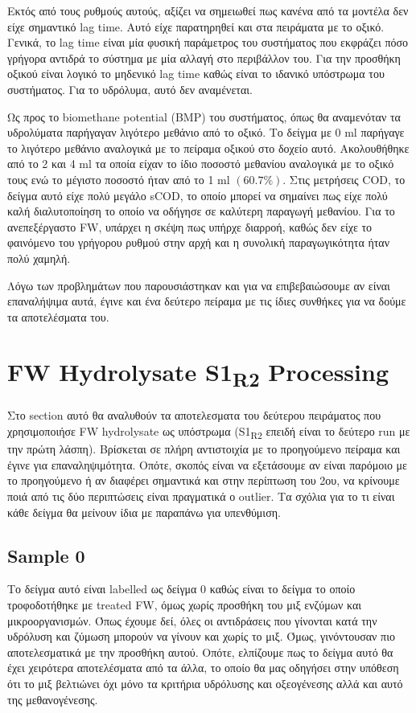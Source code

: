 \documentclass[11pt]{article}
\begin{document}
Εκτός από τους ρυθμούς αυτούς, αξίζει να σημειωθεί πως κανένα από τα μοντέλα δεν είχε σημαντικό lag time. Αυτό είχε παρατηρηθεί και στα πειράματα με το οξικό. Γενικά, το lag time είναι μία φυσική παράμετρος του συστήματος που εκφράζει πόσο γρήγορα αντιδρά το σύστημα με μία αλλαγή στο περιβάλλον του. Για την προσθήκη οξικού είναι λογικό το μηδενικό lag time καθώς είναι το ιδανικό υπόστρωμα του συστήματος. Για το υδρόλυμα, αυτό δεν αναμένεται.

Ως προς το biomethane potential (BMP) του συστήματος, όπως θα αναμενόταν τα υδρολύματα παρήγαγαν λιγότερο μεθάνιο από το οξικό. Το δείγμα με 0 ml παρήγαγε το λιγότερο μεθάνιο αναλογικά με το πείραμα οξικού στο δοχείο αυτό. Ακολουθήθηκε από το 2 και 4 ml τα οποία είχαν το ίδιο ποσοστό μεθανίου αναλογικά με το οξικό τους ενώ το μέγιστο ποσοστό ήταν από το 1 ml \(( 60.7 \% )\). Στις μετρήσεις COD, το δείγμα αυτό είχε πολύ μεγάλο sCOD, το οποίο μπορεί να σημαίνει πως είχε πολύ καλή διαλυτοποίηση το οποίο να οδήγησε σε καλύτερη παραγωγή μεθανίου. Για το ανεπεξέργαστο FW, υπάρχει η σκέψη πως υπήρχε διαρροή, καθώς δεν είχε το φαινόμενο του γρήγορου ρυθμού στην αρχή και η συνολική παραγωγικότητα ήταν πολύ χαμηλή.

Λόγω των προβλημάτων που παρουσιάστηκαν και για να επιβεβαιώσουμε αν είναι επαναλήψιμα αυτά, έγινε και ένα δεύτερο πείραμα με τις ίδιες συνθήκες για να δούμε τα αποτελέσματα του.

\section{FW Hydrolysate S1\textsubscript{R2} Processing}
\label{sec:org8c73206}
Στο section αυτό θα αναλυθούν τα αποτελεσματα του δεύτερου πειράματος που χρησιμοποιήσε FW hydrolysate ως υπόστρωμα (S1\textsubscript{R2} επειδή είναι το δεύτερο run με την πρώτη λάσπη). Βρίσκεται σε πλήρη αντιστοιχία με το προηγούμενο πείραμα και έγινε για επαναληψιμότητα. Οπότε, σκοπός είναι να εξετάσουμε αν είναι παρόμοιο με το προηγούμενο ή αν διαφέρει σημαντικά και στην περίπτωση του 2ου, να κρίνουμε ποιά από τις δύο περιπτώσεις είναι πραγματικά ο outlier. Τα σχόλια για το τι είναι κάθε δείγμα θα μείνουν ίδια με παραπάνω για υπενθύμιση.

\subsection{Sample 0}
\label{sec:org9749823}
Το δείγμα αυτό είναι labelled ως δείγμα 0 καθώς είναι το δείγμα το οποίο τροφοδοτήθηκε με treated FW, όμως χωρίς προσθήκη του μιξ ενζύμων και μικροοργανισμών. Όπως έχουμε δεί, όλες οι αντιδράσεις που γίνονται κατά την υδρόλυση και ζύμωση μπορούν να γίνουν και χωρίς το μιξ. Όμως, γινόντουσαν πιο αποτελεσματικά με την προσθήκη αυτού. Οπότε, ελπίζουμε πως το δείγμα αυτό θα έχει χειρότερα αποτελέσματα από τα άλλα, το οποίο θα μας οδηγήσει στην υπόθεση ότι το μιξ βελτιώνει όχι μόνο τα κριτήρια υδρόλυσης και οξεογένεσης αλλά και αυτό της μεθανογένεσης.
\end{document}
